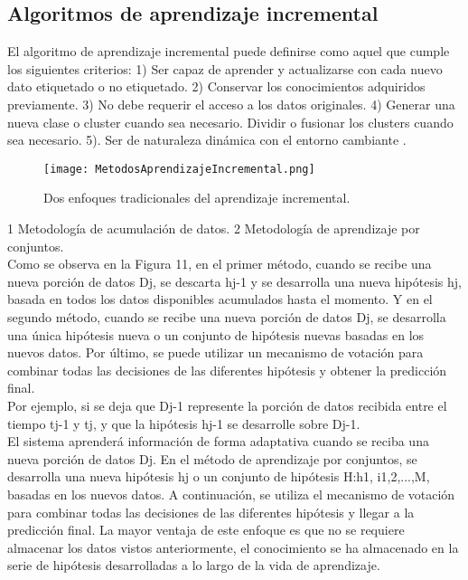     \subsection{Algoritmos de aprendizaje incremental}
      El algoritmo de aprendizaje incremental puede definirse como aquel que cumple los siguientes criterios:  
      1) Ser capaz de aprender y actualizarse con cada nuevo dato etiquetado o no etiquetado. 
      2) Conservar los conocimientos adquiridos previamente.
      3) No debe requerir el acceso a los datos originales. 
      4) Generar una nueva clase o cluster cuando sea necesario. Dividir o fusionar los clusters cuando sea necesario. 
      5). Ser de naturaleza dinámica con el entorno cambiante \cite{Deshmukh2013}.

        \begin{figure}[H]
          \centering
          \texttt{[image: MetodosAprendizajeIncremental.png]}
          \caption{Dos enfoques tradicionales del aprendizaje incremental.}
          \label{fig:fig11}
        \end{figure} 
      
      1 Metodología de acumulación de datos. 2 Metodología de aprendizaje por conjuntos.\\
        
		Como se observa en la Figura 11, en el primer método, cuando se recibe una nueva porción de datos Dj, se descarta hj-1 y se desarrolla una nueva hipótesis hj, basada en todos los datos disponibles acumulados hasta el momento. 
		Y en el segundo método, cuando se recibe una nueva porción de datos Dj, se desarrolla una única hipótesis nueva o un conjunto de hipótesis nuevas basadas en los nuevos datos. 
		Por último, se puede utilizar un mecanismo de votación para combinar todas las decisiones de las diferentes hipótesis y obtener la predicción final.\\
		
		Por ejemplo, si se deja que Dj-1 represente la porción de datos recibida entre el tiempo tj-1 y tj, y que la hipótesis hj-1 se desarrolle sobre Dj-1.\\
		El sistema aprenderá información de forma adaptativa cuando se reciba una nueva porción de datos Dj.	
		En el método de aprendizaje por conjuntos, se desarrolla una nueva hipótesis hj o un conjunto de hipótesis H:h1, i1,2,...,M, basadas en los nuevos datos.  
		A continuación, se utiliza el mecanismo de votación para combinar todas las decisiones de las diferentes hipótesis y llegar a la predicción final.
		La mayor ventaja de este enfoque es que no se requiere almacenar los datos vistos anteriormente, el conocimiento se ha almacenado en la serie de hipótesis desarrolladas a lo largo de la vida de aprendizaje.\\
		
